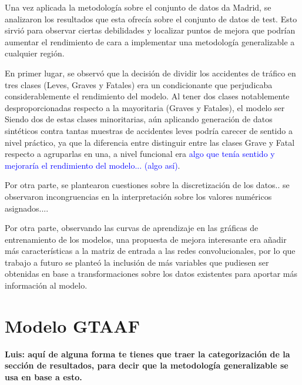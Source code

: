 \documentclass{uathesis-es}
\begin{document}
{	%
	
	Una vez aplicada la metodología sobre el conjunto de datos da Madrid, se analizaron los resultados que esta ofrecía sobre el conjunto de datos de test. Esto sirvió para observar ciertas debilidades y localizar puntos de mejora que podrían aumentar el rendimiento de cara a implementar una metodología generalizable a cualquier región.
	
	En primer lugar, se observó que la decisión de dividir los accidentes de tráfico en tres clases (Leves, Graves y Fatales) era un condicionante que perjudicaba considerablemente el rendimiento del modelo. Al tener dos clases notablemente desproporcionadas respecto a la mayoritaria (Graves y Fatales), el modelo  ser  Siendo dos de estas clases minoritarias, aún aplicando generación de datos sintéticos contra tantas muestras de accidentes leves podría carecer de sentido a nivel práctico, ya que la diferencia entre distinguir entre las clases Grave y Fatal respecto a agruparlas en una, a nivel funcional era \textcolor{blue}{algo que tenía sentido y mejoraría el rendimiento del modelo... (algo así)}.
	
	
	Por otra parte, se plantearon cuestiones sobre la discretización de los datos.. se observaron incongruencias en la interpretación sobre los valores numéricos asignados....
	
	
	Por otra parte, observando las curvas de aprendizaje en las gráficas de entrenamiento de los modelos, una propuesta de mejora interesante era añadir más características a la matriz de entrada a las redes convolucionales, por lo que trabajo a futuro se planteó la inclusión de más variables que pudiesen ser obtenidas en base a transformaciones sobre los datos existentes para aportar más información al modelo.
	
	
	\section{Modelo GTAAF}
	\label{METODOLOGIA_GTAAF}
	
	\textbf{Luis: aquí de alguna forma te tienes que traer la categorización de la sección de resultados, para decir que la metodología generalizable se usa en base a esto.}\\
	
}
\end{document}

